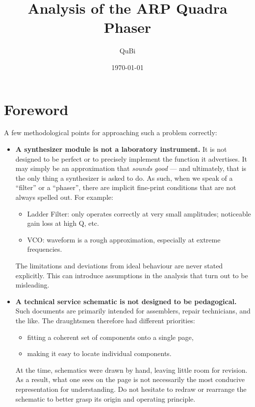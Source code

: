 \documentclass[10pt]{article}
\title{Analysis of the ARP Quadra Phaser}
\author{QuBi}
\date{\today}
\begin{document}
\maketitle


\section*{Foreword}

A few methodological points for approaching such a problem correctly:

\begin{itemize}
  \item \textbf{A synthesizer module is not a laboratory instrument.}
  It is not designed to be perfect or to precisely implement the function it advertises.
  It may simply be an approximation that \textit{sounds good} --- and ultimately, that is the only thing a synthesizer is asked to do.
  As such, when we speak of a ``filter'' or a ``phaser'', there are implicit fine-print conditions that are not always spelled out. For example:
  \begin{itemize}
    \item Ladder Filter: only operates correctly at very small amplitudes; noticeable gain loss at high Q, etc.
    \item VCO: waveform is a rough approximation, especially at extreme frequencies.
  \end{itemize}
  The limitations and deviations from ideal behaviour are never stated explicitly.
  This can introduce assumptions in the analysis that turn out to be misleading.

  \item \textbf{A technical service schematic is not designed to be pedagogical.}
  Such documents are primarily intended for assemblers, repair technicians, and the like.
  The draughtsmen therefore had different priorities:
  \begin{itemize}
    \item fitting a coherent set of components onto a single page,
    \item making it easy to locate individual components.
  \end{itemize}
  At the time, schematics were drawn by hand, leaving little room for revision.
  As a result, what one sees on the page is not necessarily the most conducive representation for understanding.
  Do not hesitate to redraw or rearrange the schematic to better grasp its origin and operating principle.


\end{itemize}
\end{document}
